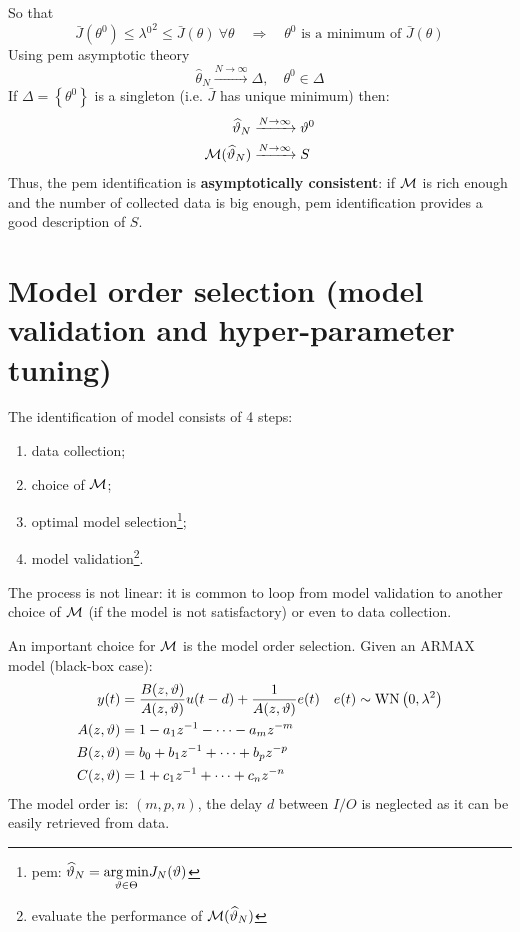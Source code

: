 So that
\begin{equation*}
\bar{J}\left(\theta ^{0}\right) \leq \lambda {^{0}}^{2} \leq \bar{J}(\theta)\  \forall \theta \quad\Longrightarrow\quad \theta ^{0} \text{ is a minimum of } \bar{J}(\theta)
\end{equation*}
Using \gls{pem} asymptotic theory
\begin{equation*}
\hat{\theta }_{N}\xrightarrow{N\rightarrow \infty} \Delta ,\quad\theta ^{0} \in \Delta 
\end{equation*}
If $ \Delta =\left\{\theta ^{0}\right\}$ is a singleton (i.e. $ \bar{J}$ has unique minimum) then:
\begin{align*}
	\widehat{\vartheta }_{N} & \xrightarrow{N\rightarrow \infty} \vartheta ^{0}\\
	\mathcal{M}(\widehat{\vartheta }_{N}) & \xrightarrow{N\rightarrow \infty} S
\end{align*}
Thus, the \gls{pem} identification is \textbf{asymptotically consistent}: if $ \mathcal{M}$ is rich enough and the number of collected data is big enough, \gls{pem} identification provides a good description of $ S$.



\section{Model order selection (model validation and hyper-parameter tuning)}

The identification of model consists of 4 steps:
\begin{enumerate}
\item data collection;
\item choice of $ \mathcal{M}$;
\item optimal model selection\footnote{\gls{pem}: $ \widehat{\vartheta }_{N} =\underset{\vartheta \in \Theta }{\operatorname*{arg\,min}} J_{N}(\vartheta)$};
\item model validation\footnote{evaluate the performance of $\mathcal{M}(\widehat{\vartheta }_{N})$}.
\end{enumerate}

The process is not linear: it is common to loop from model validation to another choice of $ \mathcal{M}$ (if the model is not satisfactory) or even to data collection.

An important choice for $ \mathcal{M}$ is the model order selection. Given an ARMAX model (black-box case):
\begin{gather*}
\begin{aligned}
y(t)  & =\frac{B(z,\vartheta)}{A(z,\vartheta)} u(t-d) +\frac{1}{A(z,\vartheta)} e(t) & e(t) \sim \operatorname{WN} \left(0,\lambda ^{2}\right)\\
A(z,\vartheta)  & =1-a_{1} z^{-1} -\cdots -a_{m} z^{-m} & \\
B(z,\vartheta) & =b_{0} +b_{1} z^{-1} +\cdots +b_{p} z^{-p} & \\
C(z,\vartheta) & =1+c_{1} z^{-1} +\cdots +c_{n} z^{-n} & 
\end{aligned}\\
\end{gather*}
The model order is: $ (m,p,n)$, the delay $ d$ between $ I/O$ is neglected as it can be easily retrieved from data.

